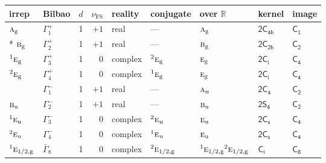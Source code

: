 \documentclass[10pt,a4paper]{article}
\makeatletter
\def\grouprule#1#2{\noalign{\marks\LTgroupmarks{\the\belowrulesep}\nobreak\vskip#1%
  \vskip\aboverulesep}\multispan\LT@cols\unskip{\leaders\hrule\@height#2\hfill\kern\z@}\cr
  \noalign{\penalty\LTrulebreak\vskip\belowrulesep\global\@lastruleclass\z@}}
\numberwithin{equation}{section}
\newcommand{\grp}[1]{\mathsf{#1}}
\newcommand{\irr}[1]{\text{\normalfont\scshape #1}}
\newcommand{\conjpair}[1]{{}^{#1}}
\newcommand{\detbox}[1]{{\setlength{\fboxsep}{1pt}\fbox{#1}}}
\newcommand{\ptag}[1]{\mathrm{#1}}
\newcommand{\fsind}{\nu_{\mathrm{FS}}}
\makeatother
\begin{document}
{\small\renewcommand{\arraystretch}{1.25}\setlength{\tabcolsep}{4pt}\begin{longtable}{@{}llrrlllll@{}}\toprule
irrep & Bilbao & $d$ & $\fsind$ & reality & conjugate & over $\mathbb{R}$ & kernel & image\\\midrule\endhead
\bottomrule\endfoot\endlastfoot
$\irr{a}_{\ptag{g}}$ & $\Gamma_{1}^{+}$ & 1 & $+1$ & real & --- & $\irr{a}_{\ptag{g}}$ & \href{2C4h.pdf}{$\grp{2C_{4h}}$} & \href{../../../rotation/data/pdf/C1.pdf}{$\grp{C_{1}}$}\\*
$\irr{b}_{\ptag{g}}$ & $\Gamma_{2}^{+}$ & 1 & $+1$ & real & --- & $\irr{b}_{\ptag{g}}$ & \href{2C2h.pdf}{$\grp{2C_{2h}}$} & \href{../../../rotation/data/pdf/C2.pdf}{$\grp{C_{2}}$}\\
$\conjpair{1}\irr{e}_{\ptag{g}}$ & $\Gamma_{3}^{+}$ & 1 & $0$ & complex & $\conjpair{2}\irr{e}_{\ptag{g}}$ & $\irr{e}_{\ptag{g}}$ & \href{2S2.pdf}{$\grp{2C_{i}}$} & \href{../../../rotation/data/pdf/C4.pdf}{$\grp{C_{4}}$}\\
$\conjpair{2}\irr{e}_{\ptag{g}}$ & $\Gamma_{4}^{+}$ & 1 & $0$ & complex & $\conjpair{1}\irr{e}_{\ptag{g}}$ & $\irr{e}_{\ptag{g}}$ & \href{2S2.pdf}{$\grp{2C_{i}}$} & \href{../../../rotation/data/pdf/C4.pdf}{$\grp{C_{4}}$}\\
\detbox{$\irr{a}_{\ptag{u}}$} & $\Gamma_{1}^{-}$ & 1 & $+1$ & real & --- & $\irr{a}_{\ptag{u}}$ & \href{2C4.pdf}{$\grp{2C_{4}}$} & \href{../../../rotation/data/pdf/C2.pdf}{$\grp{C_{2}}$}\\
$\irr{b}_{\ptag{u}}$ & $\Gamma_{2}^{-}$ & 1 & $+1$ & real & --- & $\irr{b}_{\ptag{u}}$ & \href{2S4.pdf}{$\grp{2S_{4}}$} & \href{../../../rotation/data/pdf/C2.pdf}{$\grp{C_{2}}$}\\
$\conjpair{1}\irr{e}_{\ptag{u}}$ & $\Gamma_{3}^{-}$ & 1 & $0$ & complex & $\conjpair{2}\irr{e}_{\ptag{u}}$ & $\irr{e}_{\ptag{u}}$ & \href{2C1v.pdf}{$\grp{2C_{s}}$} & \href{../../../rotation/data/pdf/C4.pdf}{$\grp{C_{4}}$}\\
$\conjpair{2}\irr{e}_{\ptag{u}}$ & $\Gamma_{4}^{-}$ & 1 & $0$ & complex & $\conjpair{1}\irr{e}_{\ptag{u}}$ & $\irr{e}_{\ptag{u}}$ & \href{2C1v.pdf}{$\grp{2C_{s}}$} & \href{../../../rotation/data/pdf/C4.pdf}{$\grp{C_{4}}$}\\
\grouprule{0pt}{\lightrulewidth}
$\conjpair{1}\irr{e}_{1/2,\ptag{g}}$ & $\bar{\Gamma}_{8}$ & 1 & $0$ & complex & $\conjpair{2}\irr{e}_{1/2,\ptag{g}}$ & $\conjpair{1}\irr{e}_{1/2,\ptag{g}}\conjpair{2}\irr{e}_{1/2,\ptag{g}}$ & \href{S2.pdf}{$\grp{C_{i}}$} & \href{../../../rotation/data/pdf/C8.pdf}{$\grp{C_{8}}$}\\

\end{longtable}}
\end{document}

